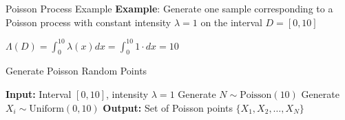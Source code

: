 \documentclass[8pt]{beamer}
\begin{document}
\begin{frame}{Poisson Process Example}
\textbf{Example}: Generate one sample corresponding to a Poisson process with constant intensity $\lambda=1$ on the interval $D=[0,10]$

$\displaystyle{\Lambda(D)=\int_0^{10} \lambda(x) dx=\int_0^{10} 1 \cdot dx=10}$

\begin{algorithm}[H]
\caption{Generate Poisson Random Points}\label{alg:poisson-points}
\begin{algorithmic}[1]
  \State \textbf{Input:} Interval $[0,10]$, intensity $\lambda = 1$
  \State Generate $N \sim \text{Poisson}(10)$
    \State Generate $X_i \sim \text{Uniform}(0,10)$
  \EndFor
  \State \textbf{Output:} Set of Poisson points $\{X_1, X_2, \ldots, X_N\}$
\end{algorithmic}
\end{algorithm}
\end{frame}

%


\end{document}
